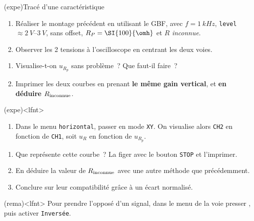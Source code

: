 \documentclass[../main/main.tex]{subfiles}
\begin{document}
\begin{tcb}(expe){Tracé d'une caractéristique}
	\begin{enumerate}
		\item Réaliser le montage précédent en utilisant le GBF, avec $f =
			      \SI{1}{kHz}$, \texttt{level} $\approx \SIrange{2}{3}{V}$, sans
		      offset, $R_P = \SI{100}{\omh}$ et $R$ \textit{inconnue}.
		\item Observer les 2 tensions à l'oscilloscope en centrant les deux voies.
	\end{enumerate}
\end{tcb}
\begin{enumerate}[label=\sqenumi, start=6]
	\item Visualise-t-on $u_{R_p}$ sans problème~? Que faut-il faire~?
	\item Imprimer les deux courbes en prenant \textbf{le même gain vertical}, et
	      \textbf{en déduire $R_{\rm inconnue}$}.
\end{enumerate}
\begin{tcb}(expe)<lfnt>{}
	\begin{enumerate}
		\item Dans le menu \texttt{horizontal}, passer en mode \texttt{XY}. On
		      visualise alors \texttt{CH2} en fonction de \texttt{CH1}, soit $u_R$
		      en fonction de $u_{R_p}$.
	\end{enumerate}
\end{tcb}
\begin{enumerate}[label=\sqenumi, start=8]
	\item Que représente cette courbe~? La figer avec le bouton \texttt{STOP} et
	      l'imprimer.
	\item En déduire la valeur de $R_{\rm inconnue}$ avec une autre méthode que
	      précédemment.
	\item Conclure sur leur compatibilité grâce à un écart normalisé.
\end{enumerate}
\begin{tcb}(rema)<lfnt>{}
	Pour prendre l'opposé d'un signal, dans le menu de la voie presser
	, puis activer \texttt{Inversée}.
\end{tcb}
\end{document}
